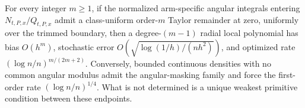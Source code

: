 For every integer \(m\geq1\), if the normalized arm-specific angular integrals entering \(N_{t,P,x}/Q_{t,P,x}\) admit a class-uniform order-\(m\) Taylor remainder at zero, uniformly over the trimmed boundary, then a degree-\((m-1)\) radial local polynomial has bias \(O(h^m)\), stochastic error \(O(\sqrt{\log(1/h)/(nh^2)})\), and optimized rate \((\log n/n)^{m/(2m+2)}\).  Conversely, bounded continuous densities with no common angular modulus admit the angular-masking family and force the first-order rate \((\log n/n)^{1/4}\).  What is not determined is a unique weakest primitive condition between these endpoints.